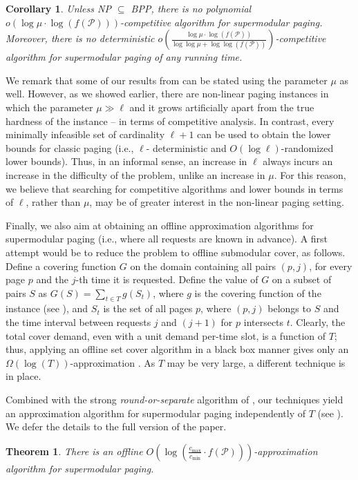 \documentclass[11pt]{article}
\newcommand{\cP}{{\mathcal{P}}}
\newtheorem{cor}[thm]{Corollary}
\newtheorem{theorem}[thm]{Theorem}
\begin{document}
\begin{cor}
	\label{thm:hardness}
	Unless \textnormal{NP $\subseteq $ BPP}, there is no polynomial $o\left(\log \mu \cdot \log \left(f(\cP)\right) \right)$-competitive algorithm for \textnormal{supermodular paging}. Moreover, there is no deterministic $o \left(\frac{\log \mu \cdot \log \left(f(\cP)\right)}{\log \log \mu+\log \log \left(f(\cP)\right)}\right)$-competitive algorithm for \textnormal{supermodular paging} of any running time. 
\end{cor}


We remark that some of our results from  can be stated using the parameter $\mu$ as well. However, as we showed earlier, there are non-linear paging instances in which the parameter $\mu \gg \ell$ and it grows artificially apart
from the true hardness of the instance – in terms of competitive analysis. In contrast, every minimally
infeasible set of cardinality $\ell+1$ can be used to obtain the lower bounds for classic paging \cite{sleator1985amortized,fiat1991competitive} (i.e., $\ell$-
deterministic and $O(\log \ell)$-randomized lower bounds). Thus, in an informal sense, an increase in $\ell$
always incurs an increase in the difficulty of the problem, unlike an increase in $\mu$. For this reason, we
believe that searching for competitive algorithms and lower bounds in terms of $\ell$, rather than $\mu$, may be of
greater interest in the non-linear paging setting.

Finally, we also aim at obtaining an offline approximation algorithms for supermodular paging (i.e., where all requests are known in advance). A first attempt would be to reduce the problem to offline submodular cover, as follows. Define a covering function $G$ on the domain containing all pairs $(p,j)$, for every page $p$ and the $j$-th time it is requested. Define the value of $G$ on a subset of pairs $S$ as $G(S) = \sum_{t \in T} g(S_t)$, where $g$ is the covering function of the instance (see ), and $S_t$ is the set of all pages $p$, where $(p,j)$ belongs to $S$ and the time interval between requests $j$ and $(j+1)$ for $p$ intersects $t$. Clearly,  the total cover demand, even with a unit demand per-time slot, is a function of $T$; thus, applying an offline set cover algorithm in a black box manner gives only an $\Omega\left(\log \left(T\right)\right)$-approximation \cite{lund1994hardness}. As $T$ may be very large, a different technique is in place.

Combined with the strong {\em round-or-separate} algorithm of \cite{gupta2020online}, our techniques yield an approximation algorithm for supermodular paging independently of $T$ (see ).
We defer the details to the full version of the paper.
\begin{theorem}
	\label{thm:approximation}
	There is an offline $O\left( \log \left(\frac{c_{\max}}{c_{\min}} \cdot f(\cP) \right)\right)$-approximation algorithm for \textnormal{supermodular paging}. %
	\end{theorem}
\end{document}
